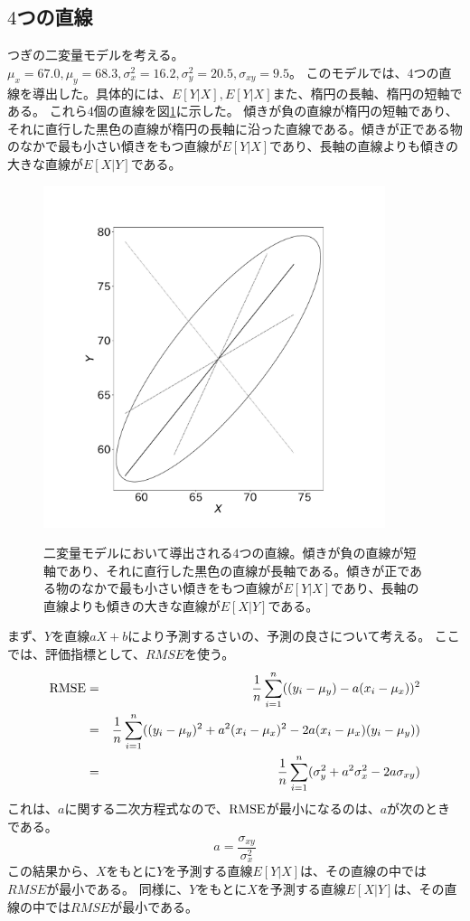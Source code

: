 \subsection{$4$つの直線}
つぎの二変量モデルを考える。
$\mu_x=67.0, \mu_y = 68.3,\sigma^2_x=16.2,\sigma^2_y=20.5,\sigma_{xy}=9.5$。
このモデルでは、$4$つの直線を導出した。具体的には、$E[Y|X],E[Y|X]$また、楕円の長軸、楕円の短軸である。
これら$4$個の直線を図\ref{fig:multivariate_normal_four_line}に示した。
傾きが負の直線が楕円の短軸であり、それに直行した黒色の直線が楕円の長軸に沿った直線である。傾きが正である物のなかで最も小さい傾きをもつ直線が$E[Y|X]$であり、長軸の直線よりも傾きの大きな直線が$E[X|Y]$である。
\begin{figure}
 \begin{center}
  \includegraphics[width=10cm]{./image/16_/multivariate_normal_four_line.pdf}
  \label{fig:multivariate_normal_four_line}
  \caption{二変量モデルにおいて導出される$4$つの直線。傾きが負の直線が短軸であり、それに直行した黒色の直線が長軸である。傾きが正である物のなかで最も小さい傾きをもつ直線が$E[Y|X]$であり、長軸の直線よりも傾きの大きな直線が$E[X|Y]$である。}
 \end{center}
\end{figure}



まず、$Y$を直線$aX+b$により予測するさいの、予測の良さについて考える。
ここでは、評価指標として、$RMSE$を使う。
\begin{eqnarray*}
 \rm{RMSE} &=& \frac{1}{n}\sum_{i=1}^n((y_i-\mu_y)-a(x_i-\mu_x))^2\\
 &=& \frac{1}{n}\sum_{i=1}^n((y_i-\mu_y)^2+a^2(x_i-\mu_x)^2-2a(x_i-\mu_x)(y_i-\mu_y))\\
&=& \frac{1}{n}\sum_{i=1}^n (\sigma_y^2+a^2\sigma_x^2-2a\sigma_{xy})\\
\end{eqnarray*}
これは、$a$に関する二次方程式なので、$\rm{RMSE}$が最小になるのは、$a$が次のときである。
\begin{equation*}
 a = \frac{\sigma_{xy}}{\sigma_x^2}
\end{equation*}
この結果から、$X$をもとに$Y$を予測する直線$E[Y|X]$は、その直線の中では$RMSE$が最小である。
同様に、$Y$をもとに$X$を予測する直線$E[X|Y]$は、その直線の中では$RMSE$が最小である。



